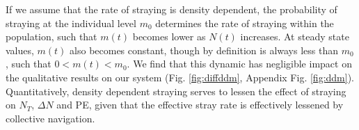 \documentclass[twocolumn,preprintnumbers,amsmath,amssymb,superscriptaddress]{revtex4}
\begin{document}
If we assume that the rate of straying is density dependent, the probability of straying at the individual level $m_0$ determines the rate of straying within the population, such that $m(t)$ becomes lower as $N(t)$ increases.
At steady state values, $m(t)$ also becomes constant, though by definition is always less than $m_0$, such that $0 < m(t) < m_0$.
We find that this dynamic has negligible impact on the qualitative results on our system (Fig. \ref{fig:diffddm}, Appendix Fig. \ref{fig:ddm}).
Quantitatively, density dependent straying serves to lessen the effect of straying on $N_T$, $\Delta N$ and PE, given that the effective stray rate is effectively lessened by collective navigation.


 
 
\end{document}
